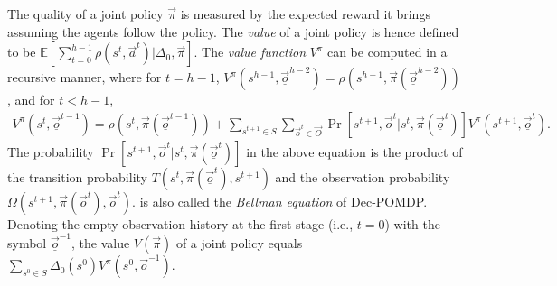 The quality of a joint policy $\vec{\pi}$ is measured by the expected reward it brings assuming the agents follow the policy.
The \textit{value} of a joint policy is hence defined to be $\mathbb{E}[\sum_{t=0}^{h-1}\rho(s^t,\vec{a}^t)|\Delta_0,\vec{\pi}]$.
The \textit{value function} $V^\pi$ can be computed in a recursive manner, where for $t=h-1$, $V^\pi(s^{h-1},\vec{\underline{o}}^{h-2})=\rho(s^{h-1},\vec{\pi}(\vec{\underline{o}}^{h-2}))$, and for $t<h-1$,
\begin{align}\label{eq:dssat-bellman}
    V^\pi(s^t,\vec{\underline{o}}^{t-1})=\rho(s^t,\vec{\pi}(\vec{\underline{o}}^{t-1}))+\sum_{s^{t+1}\in S}\sum_{\vec{o}^t\in\vec{O}}\Pr[s^{t+1},\vec{o}^t|s^t,\vec{\pi}(\vec{\underline{o}}^t)]V^\pi(s^{t+1},\vec{\underline{o}}^{t}).
\end{align}
The probability $\Pr[s^{t+1},\vec{o}^{t}|s^t,\vec{\pi}(\vec{\underline{o}}^t)]$ in the above equation is the product of the transition probability $T(s^t,\vec{\pi}(\vec{\underline{o}}^t),s^{t+1})$ and
the observation probability $\Omega(s^{t+1},\vec{\pi}(\vec{\underline{o}}^t),\vec{o}^{t})$.
 is also called the \textit{Bellman equation} of Dec-POMDP.
Denoting the empty observation history at the first stage (i.e., $t=0$) with the symbol $\vec{\underline{o}}^{-1}$, the value $V(\vec{\pi})$ of a joint policy equals $\sum_{s^0\in S}\Delta_0(s^0)V^\pi(s^0,\vec{\underline{o}}^{-1})$.